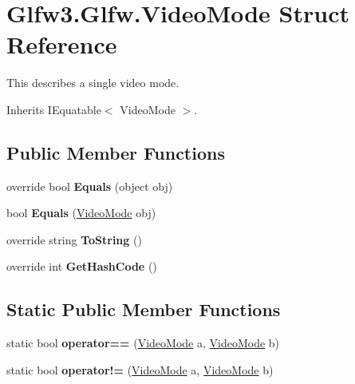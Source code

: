 \hypertarget{struct_glfw3_1_1_glfw_1_1_video_mode}{}\section{Glfw3.\+Glfw.\+Video\+Mode Struct Reference}
\label{struct_glfw3_1_1_glfw_1_1_video_mode}


This describes a single video mode.  




Inherits I\+Equatable$<$ Video\+Mode $>$.

\subsection*{Public Member Functions}
\begin{DoxyCompactItemize}
\item 
\mbox{\label{struct_glfw3_1_1_glfw_1_1_video_mode_ab017be4f4344971a68cb4ae7ae6467e6}} 
override bool {\bfseries Equals} (object obj)
\item 
\mbox{\label{struct_glfw3_1_1_glfw_1_1_video_mode_a466122c8a3d9c3130af354378459d73a}} 
bool {\bfseries Equals} (\mbox{\hyperlink{struct_glfw3_1_1_glfw_1_1_video_mode}{Video\+Mode}} obj)
\item 
\mbox{\label{struct_glfw3_1_1_glfw_1_1_video_mode_a59862243111fd4f0e18a1325dfb2b716}} 
override string {\bfseries To\+String} ()
\item 
\mbox{\label{struct_glfw3_1_1_glfw_1_1_video_mode_a982798ab11bc4d9af275ab37bf07e5e7}} 
override int {\bfseries Get\+Hash\+Code} ()
\end{DoxyCompactItemize}
\subsection*{Static Public Member Functions}
\begin{DoxyCompactItemize}
\item 
\mbox{\label{struct_glfw3_1_1_glfw_1_1_video_mode_aface5c6fc514d20fc0074beb926f2eea}} 
static bool {\bfseries operator==} (\mbox{\hyperlink{struct_glfw3_1_1_glfw_1_1_video_mode}{Video\+Mode}} a, \mbox{\hyperlink{struct_glfw3_1_1_glfw_1_1_video_mode}{Video\+Mode}} b)
\item 
\mbox{\label{struct_glfw3_1_1_glfw_1_1_video_mode_a444befce22fdfc48909c95aeffc58d30}} 
static bool {\bfseries operator!=} (\mbox{\hyperlink{struct_glfw3_1_1_glfw_1_1_video_mode}{Video\+Mode}} a, \mbox{\hyperlink{struct_glfw3_1_1_glfw_1_1_video_mode}{Video\+Mode}} b)
\end{DoxyCompactItemize}
